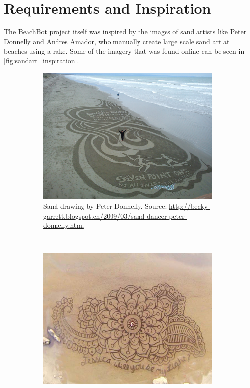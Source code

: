 \section{Requirements and Inspiration}

The BeachBot project itself was inspired by the images of sand artists like Peter Donnelly and Andres Amador, who manually create large scale sand art at beaches using a rake. Some of the imagery that was found online can be seen in \autoref{fig:sandart_inspiration}.

\begin{figure}
\centering
\begin{subfigure}[c]{1\textwidth}
\includegraphics[width=\textwidth]{images/requirements_inspiration/donnelly_1.jpg} 
\caption{Sand drawing by Peter Donnelly. Source: \url{http://becky-garrett.blogspot.ch/2009/03/sand-dancer-peter-donnelly.html}}
\end{subfigure}
\\
\begin{subfigure}[b]{0.46\textwidth}
\includegraphics[width=\textwidth]{images/requirements_inspiration/andres_armador_1.jpg} 

\end{subfigure}
\end{figure}
